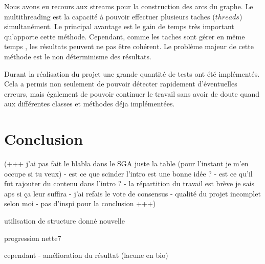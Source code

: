 \documentclass{article}
\begin{document}
Nous avons eu recours aux streams pour la construction des arcs du graphe. Le multithreading est la capacité à pouvoir effectuer plusieurs taches ($threads$) simultanément. Le principal avantage est le gain de temps très important qu'apporte cette méthode. Cependant, comme les taches sont gérer en même temps , les résultats peuvent ne pas être cohérent. Le problème majeur de cette méthode est le non déterminisme des résultats.

Durant la réalisation du projet une grande quantité de tests ont été implémentés. Cela a permis non seulement de pouvoir détecter rapidement d'éventuelles erreurs, mais également de pouvoir continuer le travail sans avoir de doute quand aux différentes classes et méthodes déja implémentées.



\section{Conclusion}

(+++ j'ai pas fait le blabla dans le SGA juste la table (pour l'instant je m'en occupe si tu veux)  - est ce que scinder l'intro est une bonne idée ? - est ce qu'il fut rajouter du contenu dans l'intro ? -  la répartition du travail est brève je sais aps si ça leur suffira -  j'ai refais le vote de consensus -  qualité du projet incomplet selon moi - pas d'inspi pour la conclusion +++)

utilisation de structure donné nouvelle

progression nette7

cependant - amélioration du résultat (lacune en bio)
\end{document}
